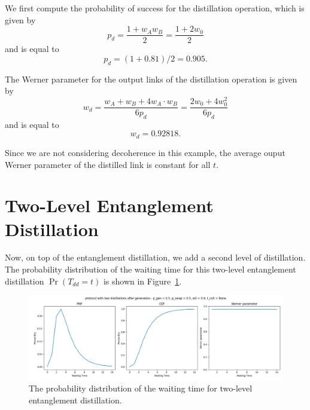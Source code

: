 \documentclass{masterthesis}
\begin{document}
We first compute the probability of success for the distillation operation, which is given by
\begin{equation}
    p_d = \frac{1 + w_A w_B}{2} = \frac{1+2w_0}{2}
\end{equation}
and is equal to
\begin{equation}
    p_d = (1 + 0.81) / 2 = 0.905 .
\end{equation}

The Werner parameter for the output links of the distillation operation is given by
\begin{equation}
    w_d = \frac{w_A + w_B + 4 w_A \cdot w_B}{6 p_d} = \frac{2w_0 + 4w_0^2}{6 p_d}
\end{equation}
and is equal to
\begin{equation}
    w_d = 0.92818 .
\end{equation}

Since we are not considering decoherence in this example, the average ouput Werner parameter of the distilled link is constant for all $t$.

\section{Two-Level Entanglement Distillation}

Now, on top of the entanglement distillation, we add a second level of distillation. The probability distribution of the waiting time for this two-level entanglement distillation $\Pr(T_{dd} = t)$ is shown in Figure~\ref{fig:two_level_distillation_waiting_time}.

\begin{figure}[ht]
    \centering
    \includegraphics[width=1\linewidth]{images/dist_tests/two distillations after generation.png}
    \caption{The probability distribution of the waiting time for two-level entanglement distillation.}
    \label{fig:two_level_distillation_waiting_time}
\end{figure}
\end{document}
